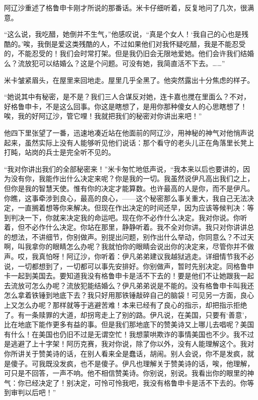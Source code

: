 \par 阿辽沙重述了格鲁申卡刚才所说的那番话。米卡仔细听着，反复地问了几次，很满意。
\par “这么说，我吃醋，她倒并不生气，”他感叹说，“真是个女人！‘我自己的心也是残酷的。’唉，我倒是爱这类残酷的人，不过如果他们对我怀疑吃醋，我是不能忍受的，不能忍受的！我们会时常打架。但是我仍旧会无限地爱她。他们会许我们结婚么？流放犯可以结婚么？这是个问题。可没有她，我简直活不下去。……”
\par 米卡皱紧眉头，在屋里来回地走。屋里几乎全黑了。他突然露出十分焦虑的样子。
\par “她说其中有秘密，是不是？我们三人合谋反对她，连卡嘉也搅在里面么？不对，好格鲁申卡，不是这么回事。你这是瞎想了，是用你那种傻女人的心思瞎想了！唉，我的好阿辽沙，管它哩！我就把我们的秘密对你讲出来吧！”
\par 他四下里张望了一番，迅速地凑近站在他面前的阿辽沙，用神秘的神气对他悄声说起来，虽然实际上没有人能够听见他们说话：那个看守的老头儿正在角落里长凳上打盹，站岗的兵士是完全听不见的。
\par “我对你讲出我们的全部秘密来！”米卡匆忙地低声说，“我本来以后也要讲的，因为没有你，我能作出什么决定来呢？你是我的一切。我虽然说伊凡高出我们之上，但你是我的智慧天使。惟有你的决定才能算数。也许最高的人是你，而不是伊凡。你瞧，这事牵涉到良心，最高的良心，——这个秘密那么事关重大，我自己无法决定，一直搁着想等你来解决。但现在作出决定的时间还早，因为应该等候判决：等到判决一下，你就来决定我的命运吧。现在你不必作什么决定。我对你说。你听着，但不必作什么决定。你站在那里，静静听着。我不全对你讲。我只对你讲讲总的想法，不讲细节，你别做声。别提出问题，别作出什么举动，你同意么？不过天啊，叫我拿你的眼睛怎么办呢？我就怕你的眼睛会说出你的决定来，尽管你并不做声。哎，我真怕呀！阿辽沙，你听着：伊凡弟弟建议我越狱逃走。详细情节我不必说，一切都想到了，一切都可以事先安排好。你别做声，暂时先别决定。同格鲁申卡一起到美国去。要知道我没有格鲁申卡是活不下去的！要是他们不让她跟我一起去流放可怎么办呢？流放犯能结婚么？伊凡弟弟说是不能的。没有格鲁申卡叫我还怎么拿着铁锤到地底下去？我只好用那铁锤敲碎自己的脑袋！可见另一方面，良心上又怎么办呢？那样就等于逃避苦难！本来已经有了良心的指示，却把指示拒绝了。有一条赎罪的大道，却拐弯走上了别的路。伊凡说，在美国，只要有‘善意’，比在地底下能作更多有益的事。但是我们那地底下的赞美诗又上哪儿去唱呢？美国有什么！在美国也仍旧不过是无谓空忙！我想蒙哄欺诈的事情美国也不少。我不过是逃避了上十字架！阿历克赛，我对你说，除了你以外，没有人能理解这个。我对你所讲关于赞美诗的话，在别人看来全是蠢话，胡闹。别人会说，你不是发疯，就是傻子。可我既没发疯，也不是傻子。伊凡也理解关于赞美诗的话，唉，他理解，可只是不回答，一声不响。他不相信赞美诗。你别说，别说。我看出你的眼里的神气：你已经决定了！别决定，可怜可怜我吧，我没有格鲁申卡是活不下去的。你等到审判以后吧！”
